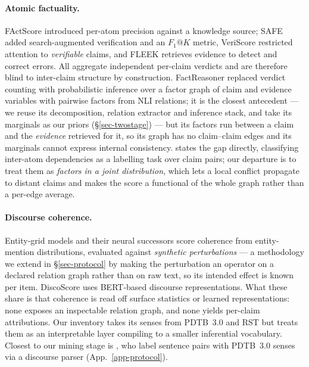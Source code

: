 \paragraph{Atomic factuality.} FActScore \citep{factscore} introduced per-atom precision against a knowledge
source; SAFE \citep{safe} added search-augmented verification and an $F_1@K$ metric, VeriScore
\citep{veriscore} restricted attention to \emph{verifiable} claims, and FLEEK \citep{fleek} retrieves evidence
to detect and correct errors. All aggregate independent per-claim verdicts and are therefore blind to
inter-claim structure by construction. FactReasoner \citep{factreasoner} replaced verdict counting with
probabilistic inference over a factor graph of claim and evidence variables with pairwise factors from NLI
relations; it is the closest antecedent --- we reuse its decomposition, relation extractor and inference
stack, and take its marginals as our priors (\S\ref{sec-twostage}) --- but its factors run between a claim and
the \emph{evidence} retrieved for it, so its graph has no claim--claim edges and its marginals cannot express
internal consistency. \citet{lorefact} states the gap directly, classifying inter-atom dependencies as a
labelling task over claim pairs; our departure is to treat them as \emph{factors in a joint distribution},
which lets a local conflict propagate to distant claims and makes the score a functional of the whole graph
rather than a per-edge average.



\paragraph{Discourse coherence.} Entity-grid models \citep{barzilay} and their neural successors \citep{li}
score coherence from entity-mention distributions, evaluated against \emph{synthetic perturbations} --- a
methodology we extend in \S\ref{sec-protocol} by making the perturbation an operator on a declared relation
graph rather than on raw text, so its intended effect is known per item. DiscoScore \citep{discoscore} uses
BERT-based discourse representations. What these share is that coherence is read off surface statistics or
learned representations: none exposes an inspectable relation graph, and none yields per-claim attributions.
Our inventory takes its senses from PDTB~3.0 \citep{pdtb} and RST \citep{mann} but treats them as an
interpretable layer compiling to a smaller inferential vocabulary. Closest to our mining stage is
\citet{liustrube}, who label sentence pairs with PDTB~3.0 senses via a discourse parser
(App.~\ref{app-protocol}).

